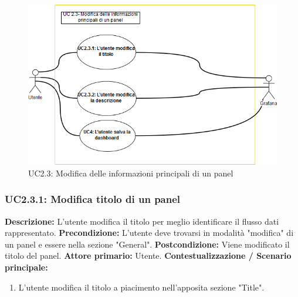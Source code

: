                     \begin{figure}[!htbp]
                    	\centering
                    	\includegraphics[width=\textwidth]{UC2-3.png}
                    	\caption{UC2.3:  Modifica delle informazioni principali di un panel}
                    	\label{uc2.3}
                    \end{figure}
                    
                \subsubsection{UC2.3.1: Modifica titolo di un panel}
                    \textbf{Descrizione:} L’utente modifica il titolo per meglio identificare il flusso dati rappresentato.
                    \newline
                    \textbf{Precondizione:} L'utente deve trovarsi in modalità "modifica" di un panel e essere nella sezione "General".
                    \newline
                    \textbf{Postcondizione:} Viene modificato il titolo del panel.
                    \newline
                    \textbf{Attore primario:} Utente.
                    \newline
                    \textbf{Contestualizzazione / Scenario principale:} \begin{enumerate}
                        \item L’utente modifica il titolo a piacimento nell'apposita sezione "Title".
                    \end{enumerate}
                
